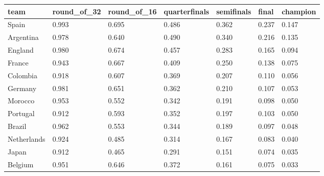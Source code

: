 \begin{tabular}{lllllll}
\toprule
team & round\_of\_32 & round\_of\_16 & quarterfinals & semifinals & final & champion \\
\midrule
Spain & 0.993 & 0.695 & 0.486 & 0.362 & 0.237 & 0.147 \\
Argentina & 0.978 & 0.640 & 0.490 & 0.340 & 0.216 & 0.135 \\
England & 0.980 & 0.674 & 0.457 & 0.283 & 0.165 & 0.094 \\
France & 0.943 & 0.667 & 0.409 & 0.250 & 0.138 & 0.075 \\
Colombia & 0.918 & 0.607 & 0.369 & 0.207 & 0.110 & 0.056 \\
Germany & 0.981 & 0.651 & 0.362 & 0.210 & 0.107 & 0.053 \\
Morocco & 0.953 & 0.552 & 0.342 & 0.191 & 0.098 & 0.050 \\
Portugal & 0.912 & 0.593 & 0.352 & 0.197 & 0.103 & 0.050 \\
Brazil & 0.962 & 0.553 & 0.344 & 0.189 & 0.097 & 0.048 \\
Netherlands & 0.924 & 0.485 & 0.314 & 0.167 & 0.083 & 0.040 \\
Japan & 0.912 & 0.465 & 0.291 & 0.151 & 0.074 & 0.035 \\
Belgium & 0.951 & 0.646 & 0.372 & 0.161 & 0.075 & 0.033 \\
\bottomrule
\end{tabular}
